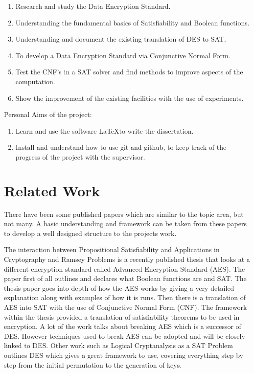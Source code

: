 \documentclass[11pt,a4paper]{report}
\begin{document}
\begin{enumerate}
\item Research and study the Data Encryption Standard.
\item Understanding the fundamental basics of Satisfiability and Boolean functions.
\item Understanding and document the existing translation of DES to SAT.
\item To develop a Data Encryption Standard via Conjunctive Normal Form.
\item Test the CNF's in a SAT solver and find methods to improve aspects of the computation.
\item Show the improvement of the existing facilities with the use of experiments.
\end{enumerate} 

\noindent Personal Aims of the project:
\begin{enumerate}
\item Learn and use the software \LaTeX \space to write the dissertation.
\item Install and understand how to use git and github, to keep track of the progress of the project with the supervisor.
\end{enumerate}

\section{Related Work}
\label{cha:RWork}
There have been some published papers which are similar to the topic area, but not many. A basic understanding and framework can be taken from these papers to develop a well designed structure to the projects work.

The interaction between Propositional Satisfiability and Applications in Cryptography and Ramsey Problems \cite{Gwynne2010Interaction} is a recently published thesis that looks at a different encryption standard called Advanced Encryption Standard (AES). The paper first of all outlines and declares what Boolean functions are and SAT. The thesis paper goes into depth of how the AES works by giving a very detailed explanation along with examples of how it is runs. Then there is a translation of AES into SAT with the use of Conjunctive Normal Form (CNF). The framework within the thesis provided a translation of satisfiability theorems to be used in encryption. A lot of the work talks about breaking AES which is a successor of DES. However techniques used to break AES can be adopted and will be closely linked to DES. 
Other work such as Logical Cryptanalysis as a SAT Problem \cite{Fabio2000LogicalSAT} outlines DES which gives a great framework to use, covering everything step by step from the initial permutation to the generation of keys.
\end{document}
